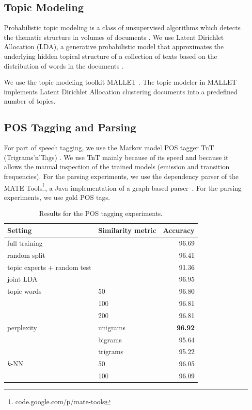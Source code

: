\subsection{Topic Modeling}

Probabilistic topic modeling is a class of unsupervised algorithms which detects the thematic structure in volumes of documents \cite{Blei:2012:PTM:2133806.2133826}. We use Latent Dirichlet Allocation (LDA),  a generative probabilistic model that approximates the underlying hidden topical structure of a collection of texts based on the distribution of words in the documents \cite{Blei:2003:LDA:944919.944937}.

We   use   the   topic   modeling   toolkit   MALLET  \cite{McCallumMALLET}.    The  topic  modeler  in MALLET implements Latent Dirichlet Allocation  clustering  documents  into  a  predefined number of topics.

\subsection{POS Tagging and Parsing}

For part of speech tagging, we use the Markov model POS tagger TnT (Trigrams'n'Tags) \cite{brants:00.2}. We use TnT mainly because of its speed and because it allows the manual inspection of the trained models (emission and transition
frequencies).
For the parsing experiments, we use the dependency parser of the MATE Tools\footnote{code.google.com/p/mate-tools}, a Java implementation of a graph-based parser~\cite{bohnet:2010:PAPERS}. For the parsing experiments, we use gold POS tags.



\begin{table}[!t]
\centering
\begin{tabular}{l|l|r|}
Setting & Similarity metric & Accuracy \\ \hline
full training &  & 96.69 \\ 
random split & & 96.41 \\ 
topic experts + random test &  & 91.36 \\ \hline
joint LDA &   & 96.95 \\ \hline
topic words & 50 & 96.80 \\ 
 & 100 & 96.81 \\ 
 & 200 & 96.81 \\ \hline
perplexity & unigrams & \textbf{96.92} \\ 
 & bigrams & 95.64 \\
 & trigrams & 95.22 \\ \hline
$k$-NN & 50 & 96.05 \\  
 & 100 & 96.09 \\ \hline
\end{tabular}

\caption{Results for the POS tagging experiments.}
\label{tab:overallresultspostag}
\end{table}



